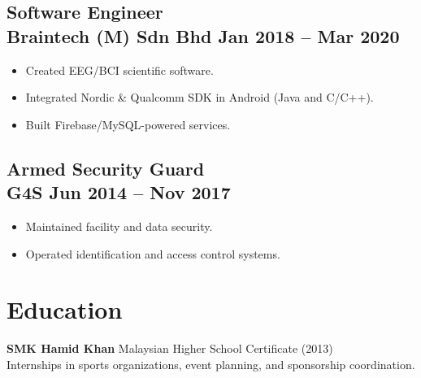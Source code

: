 \documentclass[11pt,a4paper]{article}
\begin{document}
\subsection*{Software Engineer \\ \normalfont Braintech (M) Sdn Bhd \hfill Jan 2018 -- Mar 2020}
\begin{itemize}[leftmargin=1.5em]
    \item Created EEG/BCI scientific software.
    \item Integrated Nordic & Qualcomm SDK in Android (Java and C/C++).
    \item Built Firebase/MySQL-powered services.
\end{itemize}

\subsection*{Armed Security Guard \\ \normalfont G4S \hfill Jun 2014 -- Nov 2017}
\begin{itemize}[leftmargin=1.5em]
    \item Maintained facility and data security.
    \item Operated identification and access control systems.
\end{itemize}

\section*{Education}
\textbf{SMK Hamid Khan} \hfill Malaysian Higher School Certificate (2013) \\
Internships in sports organizations, event planning, and sponsorship coordination.
\end{document}
